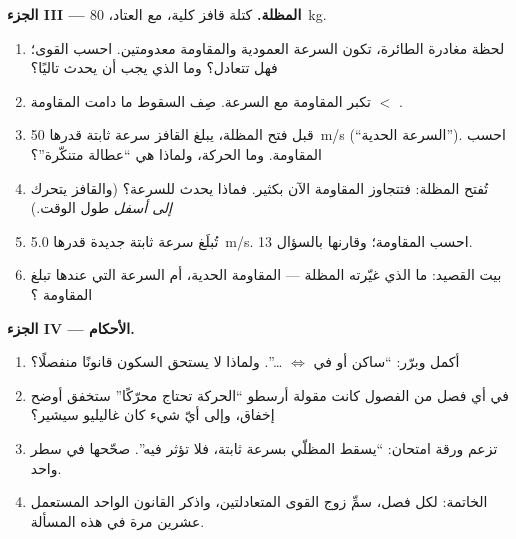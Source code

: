 \begin{problem}
\medskip
\noindent\textbf{الجزء III --- المظلة.}
كتلة قافز كلية، مع العتاد، \qty{80}{kg}.
\begin{enumerate}[resume]
  \item لحظة مغادرة الطائرة، تكون السرعة العمودية والمقاومة معدومتين.
        احسب القوى؛ فهل تتعادل؟ وما الذي يجب أن يحدث تاليًا؟
  \item تكبر المقاومة مع السرعة. صِف السقوط ما دامت المقاومة $<$ .
  \item قبل فتح المظلة، يبلغ القافز سرعة ثابتة قدرها
        \qty{50}{m/s} (``السرعة الحدية''). احسب المقاومة. وما
        الحركة، ولماذا هي ``عطالة متنكّرة''؟
  \item تُفتح المظلة: فتتجاوز المقاومة الآن  بكثير. فماذا
        يحدث للسرعة؟ (والقافز يتحرك \emph{إلى أسفل}
        طول الوقت.)
  \item تُبلَغ سرعة ثابتة جديدة قدرها \qty{5.0}{m/s}. احسب المقاومة؛
        وقارنها بالسؤال 13.
  \item بيت القصيد: ما الذي غيّرته المظلة --- المقاومة
        الحدية، أم السرعة التي عندها تبلغ المقاومة ؟
\end{enumerate}

\medskip
\noindent\textbf{الجزء IV --- الأحكام.}
\begin{enumerate}[resume]
  \item أكمل وبرّر: ``ساكن أو في 
        $\iff$ \dots''. ولماذا لا يستحق السكون قانونًا منفصلًا؟
  \item في أي فصل من الفصول كانت مقولة أرسطو ``الحركة تحتاج محرّكًا''
        ستخفق أوضح إخفاق، وإلى أيّ شيء كان غاليليو سيشير؟
  \item تزعم ورقة امتحان: ``يسقط المظلّي بسرعة ثابتة،
        فلا  تؤثر فيه''. صحّحها في سطر واحد.
  \item الخاتمة: لكل فصل، سمِّ زوج القوى المتعادلتين،
        واذكر القانون الواحد المستعمل عشرين مرة في هذه المسألة.
\end{enumerate}
\end{problem}
